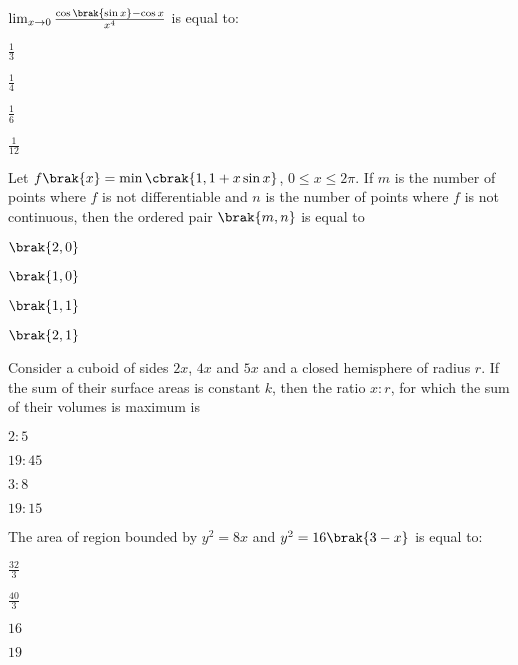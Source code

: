\item $\lim_{x\to 0}\frac{\cos\brak{\sin x}-\cos x}{x^4}$ is equal to:

\hfill{}
\begin{enumerate}
\begin{multicols}{4}
\item $\frac{1}{3}$
\item $\frac{1}{4}$
\item $\frac{1}{6}$
\item $\frac{1}{12}$
\end{multicols}
\end{enumerate}

\item Let $f\brak{x}=\min\cbrak{1,1+x\sin x}$, $0\leq x\leq 2\pi$. If $m$ is the number of points where $f$ is not differentiable and $n$ is the number of points where $f$ is not continuous, then the ordered pair $\brak{m,n}$ is equal to

\hfill{}
\begin{enumerate}
\begin{multicols}{4}
\item $\brak{2,0}$
\item $\brak{1,0}$
\item $\brak{1,1}$
\item $\brak{2,1}$
\end{multicols}
\end{enumerate}

\item Consider a cuboid of sides $2x$, $4x$ and $5x$ and a closed hemisphere of radius $r$. If the sum of their surface areas is constant $k$, then the ratio $x:r$, for which the sum of their volumes is maximum is 

\hfill{}
\begin{enumerate}
\begin{multicols}{4}
\item $2:5$
\item $19:45$
\item $3:8$
\item $19:15$
\end{multicols}
\end{enumerate}

\item The area of region bounded by $y^2=8x$ and $y^2=16\brak{3-x}$ is equal to:

\hfill{}
\begin{enumerate}
\begin{multicols}{4}
\item $\frac{32}{3}$
\item $\frac{40}{3}$
\item $16$
\item $19$
\end{multicols}
\end{enumerate}


